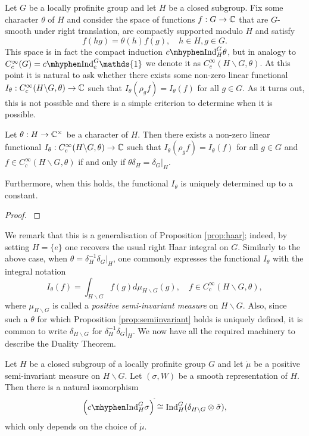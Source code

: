 Let $G$ be a locally profinite group and let $H$ be a closed subgroup. Fix some character $\theta$ of $H$ and consider the space of functions $f:G\to\mathbb{C}$ that are $G$-smooth under right translation, are compactly supported modulo $H$ and satisfy $$f(hg)=\theta(h)f(g),\quad h\in H,g\in G.$$
This space is in fact the compact induction $\cInd_H^G\theta$, but in analogy to $\CG=\cInd_{e}^G\mathds{1}$ we denote it as $C_c^{\infty}(H\backslash G,\theta)$. At this point it is natural to ask whether there exists some non-zero linear functional $I_{\theta}:C_c^{\infty}(H\backslash G,\theta)\to\mathbb{C}$ such that $I_{\theta}(\rho_g f)=I_{\theta}(f)$ for all $g\in G$. As it turns out, this is not possible and there is a simple criterion to determine when it is possible.

\begin{prop}\label{prop:semiinvariant}
    Let $\theta:H\to\mathbb{C}^{\times}$ be a character of $H$. Then there exists a non-zero linear functional $I_{\theta}:C_c^{\infty}(H\backslash G,\theta)\to\mathbb{C}$ such that $I_{\theta}(\rho_g f)=I_{\theta}(f)$ for all $g\in G$ and $f\in C_c^{\infty}(H\backslash G,\theta)$ if and only if $\theta\delta_H=\delta_G|_H$.

    Furthermore, when this holds, the functional $I_\theta$ is uniquely determined up to a constant.
\end{prop}
\begin{proof}
    \cite[Proposition 3.4]{BH1}
\end{proof}

We remark that this is a generalisation of Proposition \ref{prop:haar}; indeed, by setting $H=\{e\}$ one recovers the usual right Haar integral on $G$. Similarly to the above case, when $\theta=\delta_H^{-1}\delta_G|_H$, one commonly expresses the functional $I_\theta$ with the integral notation 
$$I_\theta(f)=\int_{H\backslash G}f(g)d\mu_{H\backslash G}(g),\quad f\in C_c^{\infty}(H\backslash G,\theta),$$
where $\mu_{H\backslash G}$ is called a \textit{positive semi-invariant measure} on $H\backslash G$. Also, since such a $\theta$ for which Proposition \ref{prop:semiinvariant} holds is uniquely defined, it is common to write $\delta_{H\backslash G}$ for $\delta_H^{-1}\delta_G|_H$. We now have all the required machinery to describe the Duality Theorem.

\begin{thm}\label{thm:duality}
    Let $H$ be a closed subgroup of a locally profinite group $G$ and let $\dot{\mu}$ be a positive semi-invariant measure on $H\backslash G$. Let $(\sigma,W)$ be a smooth representation of $H$. Then there is a natural isomorphism
    $$\left(\cInd_H^G\sigma \right)^{\check{}}\cong \Ind_H^G(\delta_{H\backslash G}\otimes \check{\sigma}),$$
    which only depends on the choice of $\dot{\mu}$.
\end{thm}

